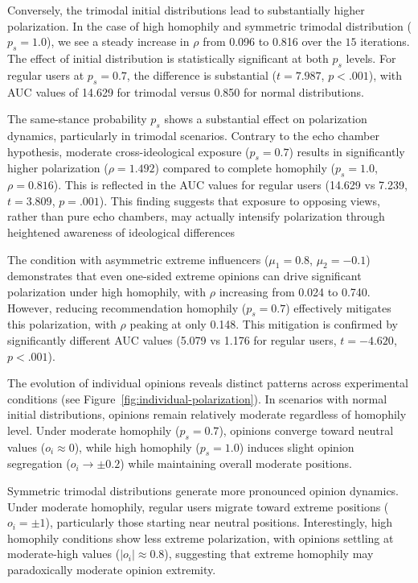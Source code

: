 Conversely, the trimodal initial distributions lead to substantially higher polarization. In the case of high homophily and symmetric trimodal distribution ($p_s = 1.0$), we see a steady increase in $\rho$ from 0.096 to 0.816 over the $15$ iterations. The effect of initial distribution is statistically significant at both $p_s$ levels. For regular users at $p_s = 0.7$, the difference is substantial ($t = 7.987$, $p < .001$), with AUC values of 14.629 for trimodal versus 0.850 for normal distributions.

The same-stance probability $p_s$ shows a substantial effect on polarization dynamics, particularly in trimodal scenarios. Contrary to the echo chamber hypothesis, moderate cross-ideological exposure ($p_s = 0.7$) results in significantly higher polarization ($\rho = 1.492$) compared to complete homophily ($p_s = 1.0$, $\rho = 0.816$). This is reflected in the AUC values for regular users (14.629 vs 7.239, $t = 3.809$, $p = .001$). This finding suggests that exposure to opposing views, rather than pure echo chambers, may actually intensify polarization through heightened awareness of ideological differences

The condition with asymmetric extreme influencers ($\mu_1 = 0.8$, $\mu_2 = -0.1$) demonstrates that even one-sided extreme opinions can drive significant polarization under high homophily, with $\rho$ increasing from 0.024 to 0.740. However, reducing recommendation homophily ($p_s = 0.7$) effectively mitigates this polarization, with $\rho$ peaking at only 0.148. This mitigation is confirmed by significantly different AUC values (5.079 vs 1.176 for regular users, $t = -4.620$, $p < .001$).





The evolution of individual opinions reveals distinct patterns across experimental conditions (see Figure~\ref{fig:individual-polarization}). In scenarios with normal initial distributions, opinions remain relatively moderate regardless of homophily level. Under moderate homophily ($p_s = 0.7$), opinions converge toward neutral values ($o_i \approx 0$), while high homophily ($p_s = 1.0$) induces slight opinion segregation ($o_i \rightarrow \pm0.2$) while maintaining overall moderate positions.

Symmetric trimodal distributions generate more pronounced opinion dynamics. Under moderate homophily, regular users migrate toward extreme positions ($o_i = \pm1$), particularly those starting near neutral positions. Interestingly, high homophily conditions show less extreme polarization, with opinions settling at moderate-high values ($|o_i| \approx 0.8$), suggesting that extreme homophily may paradoxically moderate opinion extremity.

